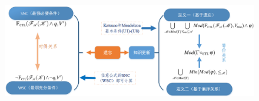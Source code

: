 \documentclass[aspectratio=1610, 9pt, CJK]{beamer}
\begin{document}
\begin{frame}
\begin{figure}
%		
%		
%	
%		
	\includegraphics[scale=0.4]{figures/sncAndWsc0}
\end{figure}  
\end{frame}
\end{document}
